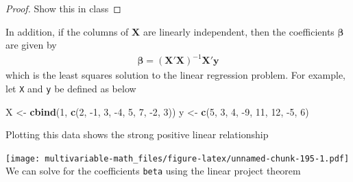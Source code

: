 \documentclass[
]{book}
\newenvironment{Shaded}{\begin{snugshade}}{\end{snugshade}}
\newcommand{\CommentTok}[1]{\textcolor[rgb]{0.56,0.35,0.01}{\textit{#1}}}
\newcommand{\DataTypeTok}[1]{\textcolor[rgb]{0.13,0.29,0.53}{#1}}
\newcommand{\DecValTok}[1]{\textcolor[rgb]{0.00,0.00,0.81}{#1}}
\newcommand{\KeywordTok}[1]{\textcolor[rgb]{0.13,0.29,0.53}{\textbf{#1}}}
\newcommand{\NormalTok}[1]{#1}
\newcommand{\OperatorTok}[1]{\textcolor[rgb]{0.81,0.36,0.00}{\textbf{#1}}}
\newcommand{\StringTok}[1]{\textcolor[rgb]{0.31,0.60,0.02}{#1}}
\theoremstyle{definition}
\theoremstyle{definition}
\theoremstyle{definition}
\theoremstyle{definition}
\theoremstyle{remark}
\begin{document}
\begin{proof}
Show this in class
\end{proof}

In addition, if the columns of \(\mathbf{X}\) are linearly independent, then the coefficients \(\boldsymbol{\beta}\) are given by
\[
\begin{aligned}
\boldsymbol{\beta} = \left( \mathbf{X}'\mathbf{X} \right)^{-1} \mathbf{X}' \mathbf{y}
\end{aligned}
\]
which is the least squares solution to the linear regression problem. For example, let \texttt{X} and \texttt{y} be defined as below

\begin{Shaded}
\begin{Highlighting}[]
\NormalTok{X <-}\StringTok{ }\KeywordTok{cbind}\NormalTok{(}\DecValTok{1}\NormalTok{, }\KeywordTok{c}\NormalTok{(}\DecValTok{2}\NormalTok{, }\DecValTok{-1}\NormalTok{, }\DecValTok{3}\NormalTok{, }\DecValTok{-4}\NormalTok{, }\DecValTok{5}\NormalTok{, }\DecValTok{7}\NormalTok{, }\DecValTok{-2}\NormalTok{, }\DecValTok{3}\NormalTok{))}
\NormalTok{y <-}\StringTok{ }\KeywordTok{c}\NormalTok{(}\DecValTok{5}\NormalTok{, }\DecValTok{3}\NormalTok{, }\DecValTok{4}\NormalTok{, }\DecValTok{-9}\NormalTok{, }\DecValTok{11}\NormalTok{, }\DecValTok{12}\NormalTok{, }\DecValTok{-5}\NormalTok{, }\DecValTok{6}\NormalTok{)}
\end{Highlighting}
\end{Shaded}

Plotting this data shows the strong positive linear relationship

\begin{Shaded}
\end{Shaded}

\texttt{[image: multivariable-math\_files/figure-latex/unnamed-chunk-195-1.pdf]}
We can solve for the coefficients \texttt{beta} using the linear project theorem

\begin{Shaded}
\end{Shaded}
\end{document}
